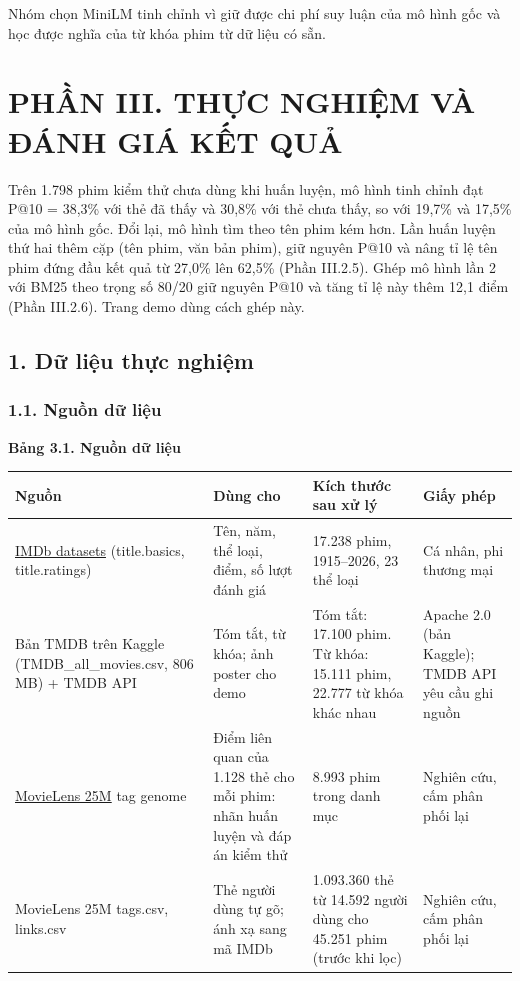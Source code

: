 \documentclass[12pt,a4paper]{article}
\newcommand{\np}{\Needspace{8\baselineskip}}
\let\oldsubsection\subsection
\renewcommand{\subsection}{\Needspace{12\baselineskip}\oldsubsection}
\let\oldsubsubsection\subsubsection
\renewcommand{\subsubsection}{\Needspace{10\baselineskip}\oldsubsubsection}
\newcommand{\chap}[1]{\clearpage\section{#1}}
\begin{document}
Nhóm chọn MiniLM tinh chỉnh vì giữ được chi phí suy luận của mô hình gốc và học được nghĩa của từ khóa phim từ dữ liệu có sẵn.

\chap{PHẦN III. THỰC NGHIỆM VÀ ĐÁNH GIÁ KẾT QUẢ}

Trên 1.798 phim kiểm thử chưa dùng khi huấn luyện, mô hình tinh chỉnh đạt P@10 = 38,3\% với thẻ đã thấy và 30,8\% với thẻ chưa thấy, so với 19,7\% và 17,5\% của mô hình gốc. Đổi lại, mô hình tìm theo tên phim kém hơn. Lần huấn luyện thứ hai thêm cặp (tên phim, văn bản phim), giữ nguyên P@10 và nâng tỉ lệ tên phim đứng đầu kết quả từ 27,0\% lên 62,5\% (Phần III.2.5). Ghép mô hình lần 2 với BM25 theo trọng số 80/20 giữ nguyên P@10 và tăng tỉ lệ này thêm 12,1 điểm (Phần III.2.6). Trang demo dùng cách ghép này.

\subsection{1. Dữ liệu thực nghiệm}

\subsubsection{1.1. Nguồn dữ liệu}

\np\textbf{Bảng 3.1. Nguồn dữ liệu}

{\def\LTcaptype{}\small
\begin{longtable}[]{@{}*{4}{P{(\linewidth - 6\tabcolsep) * }}@{}}
\toprule
\textbf{Nguồn} & \textbf{Dùng cho} & \textbf{Kích thước sau xử lý} & \textbf{Giấy phép} \\
\midrule
\endhead
\bottomrule
\endlastfoot
\href{https://datasets.imdbws.com/}{IMDb datasets} (title.basics, title.ratings) & Tên, năm, thể loại, điểm, số lượt đánh giá & 17.238 phim, 1915--2026, 23 thể loại & Cá nhân, phi thương mại \\
Bản TMDB trên Kaggle (TMDB\_all\_movies.csv, 806 MB) + TMDB API & Tóm tắt, từ khóa; ảnh poster cho demo & Tóm tắt: 17.100 phim. Từ khóa: 15.111 phim, 22.777 từ khóa khác nhau & Apache 2.0 (bản Kaggle); TMDB API yêu cầu ghi nguồn \\
\href{https://grouplens.org/datasets/movielens/25m/}{MovieLens 25M} tag genome & Điểm liên quan của 1.128 thẻ cho mỗi phim: nhãn huấn luyện và đáp án kiểm thử & 8.993 phim trong danh mục & Nghiên cứu, cấm phân phối lại \\
MovieLens 25M tags.csv, links.csv & Thẻ người dùng tự gõ; ánh xạ sang mã IMDb & 1.093.360 thẻ từ 14.592 người dùng cho 45.251 phim (trước khi lọc) & Nghiên cứu, cấm phân phối lại \\
\end{longtable}
}
\end{document}
